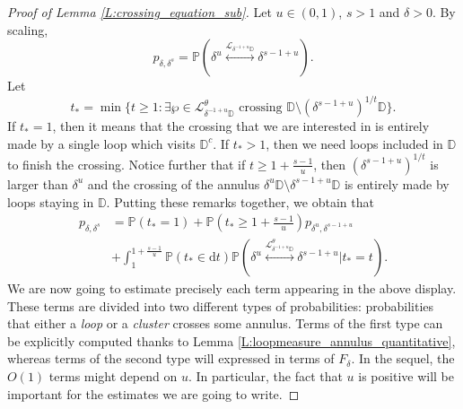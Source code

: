 \documentclass[11pt]{article}
\theoremstyle{remark}
\newcommand{\D}{\mathbb{D}}
\newcommand{\Lc}{\mathcal{L}}
\newcommand{\Prob}[1]{\mathbb{P} \left( #1 \right) }
\renewcommand{\d}{\mathrm{d}}
\numberwithin{equation}{section}
\begin{document}
\begin{proof}[Proof of Lemma \ref{L:crossing_equation_sub}]
Let $u \in (0,1)$, $s>1$ and $\delta >0$. By scaling,
\[
p_{\delta,\delta^s} = \Prob{ \delta^u \overset{\Lc_{\delta^{-1+u} \D}}{\longleftrightarrow} \delta^{s-1+u} }.
\]
Let
\begin{equation}
t_* = \min \{ t \geq 1: \exists \wp \in \Lc_{ \delta^{-1+u} \D}^\theta \text{~crossing~} \D \setminus ( \delta^{s-1+u})^{1/t} \D \}.
\end{equation}
If $t_* =1$, then it means that the crossing that we are interested in is entirely made by a single loop which visits $\D^c$. If $t_* >1$, then we need loops included in $\D$ to finish the crossing. Notice further that if $t \geq 1 + \frac{s-1}{u}$, then $(\delta^{s-1+u})^{1/t}$ is larger than $\delta^u$ and the crossing of the annulus $\delta^u \D \setminus \delta^{s-1+u} \D$ is entirely made by loops staying in $\D$. Putting these remarks together, we obtain that
\begin{align*}
p_{\delta,\delta^s}
& = \Prob{ t_* = 1} + \Prob{t_* \geq 1 + \frac{s-1}{u} } p_{\delta^u, \delta^{s-1+u}} \\
& + \int_1^{1 + \frac{s-1}{u}} \Prob{ t_* \in \d t}
\Prob{ \delta^{u} \overset{\Lc_{\delta^{-1+u} \D}^\theta}{\longleftrightarrow} \delta^{s-1+u} \Big\vert t_* = t}.
\end{align*}
We are now going to estimate precisely each term appearing in the above display. These terms are divided into two different types of probabilities: probabilities that either a \emph{loop} or a \emph{cluster} crosses some annulus. Terms of the first type can be explicitly computed thanks to Lemma \ref{L:loopmeasure_annulus_quantitative}, whereas terms of the second type will expressed in terms of $F_\delta$.
In the sequel, the $O(1)$ terms might depend on $u$. In particular, the fact that $u$ is positive will be important for the estimates we are going to write.


\end{proof}
\end{document}
